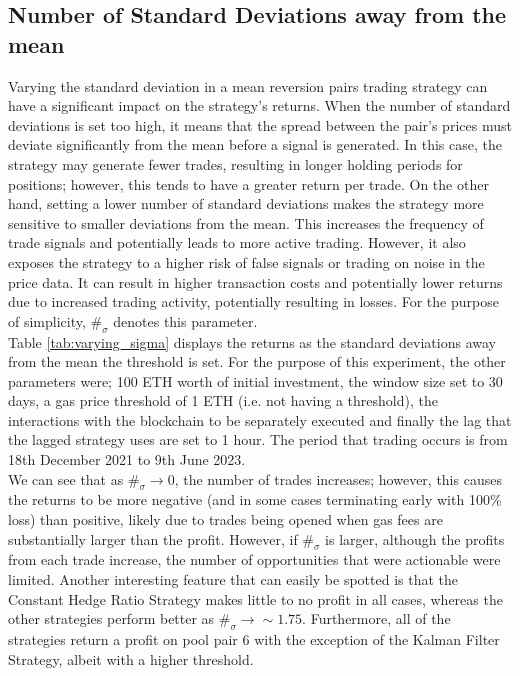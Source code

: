 \subsection{Number of Standard Deviations away from the mean}
Varying the standard deviation in a mean reversion pairs trading strategy can have a significant impact on the strategy's returns. When the number of standard deviations is set too high, it means that the spread between the pair's prices must deviate significantly from the mean before a signal is generated. In this case, the strategy may generate fewer trades, resulting in longer holding periods for positions; however, this tends to have a greater return per trade. On the other hand, setting a lower number of standard deviations makes the strategy more sensitive to smaller deviations from the mean. This increases the frequency of trade signals and potentially leads to more active trading. However, it also exposes the strategy to a higher risk of false signals or trading on noise in the price data. It can result in higher transaction costs and potentially lower returns due to increased trading activity, potentially resulting in losses. For the purpose of simplicity, $\#_{\sigma}$ denotes this parameter.
\\[3mm]
Table \ref{tab:varying_sigma} displays the returns as the standard deviations away from the mean the threshold is set. For the purpose of this experiment, the other parameters were; 100 ETH worth of initial investment, the window size set to 30 days, a gas price threshold of 1 ETH (i.e. not having a threshold), the interactions with the blockchain to be separately executed and finally the lag that the lagged strategy uses are set to 1 hour. The period that trading occurs is from 18th December 2021 to 9th June 2023.
\\[3mm]
We can see that as $\#_{\sigma} \rightarrow 0$, the number of trades increases; however, this causes the returns to be more negative (and in some cases terminating early with 100\% loss) than positive, likely due to trades being opened when gas fees are substantially larger than the profit. However, if $\#_{\sigma}$ is larger, although the profits from each trade increase, the number of opportunities that were actionable were limited. Another interesting feature that can easily be spotted is that the Constant Hedge Ratio Strategy makes little to no profit in all cases, whereas the other strategies perform better as $\#_{\sigma} \rightarrow \sim 1.75$. Furthermore, all of the strategies return a profit on pool pair 6 with the exception of the Kalman Filter Strategy, albeit with a higher threshold.
